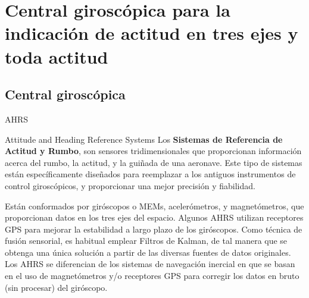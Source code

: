 
\section{Central girosc\'opica para la indicaci\'on de actitud en tres ejes y toda actitud}
\label{sec:central.giroscopica}

\subsection{Central girosc\'opica}
\label{sec:central.giroscopica.basico}

\begin{frame}
  
\end{frame}


\begin{frame}{AHRS}

\begin{block}{Attitude and Heading Reference Systems}
Los \textbf{Sistemas de Referencia de Actitud y Rumbo}, son sensores tridimensionales que proporcionan información acerca del rumbo, la actitud, y la guiñada de una aeronave. Este tipo de sistemas están específicamente diseñados para reemplazar a los antiguos instrumentos de control giroscópicos, y proporcionar una mejor precisión y fiabilidad. 

Est\'an conformados por gir\'oscopos o MEMs, acelerómetros, y magnetómetros, que proporcionan datos en los tres ejes del espacio. Algunos AHRS utilizan receptores GPS para mejorar la estabilidad a largo plazo de los giróscopos. Como técnica de fusión sensorial, es habitual emplear Filtros de Kalman, de tal manera que se obtenga una única solución a partir de las diversas fuentes de datos originales. Los AHRS se diferencian de los sistemas de navegación inercial en que se basan en el uso de magnetómetros y/o receptores GPS para corregir los datos en bruto (sin procesar) del giróscopo. 

\end{block}

\end{frame}


